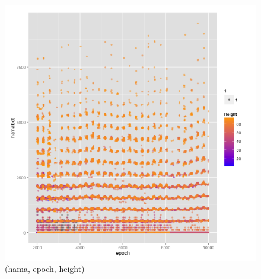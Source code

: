 \documentclass[english]{article}\usepackage[]{graphicx}\usepackage[]{color}
\begin{document}
\begin{figure}[H]
\begin{minipage}{.50\textwidth}
\includegraphics[width=\linewidth]{hamaheight}
\caption{(hama, epoch, height)}
\end{minipage}
\end{figure}
\end{document}
